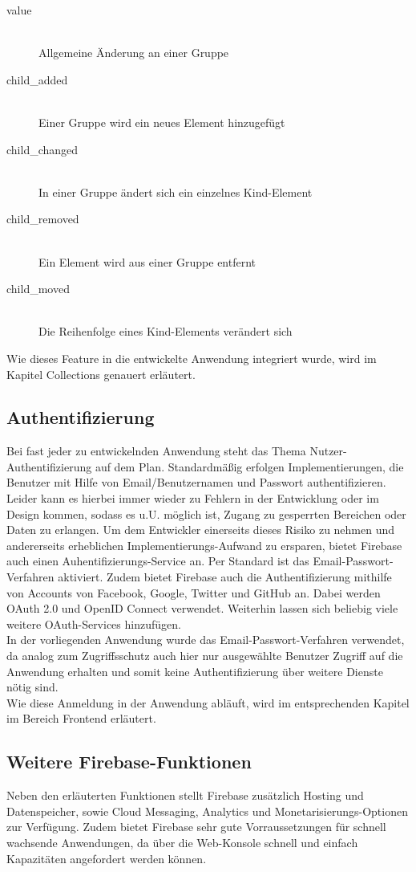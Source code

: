 \begin{description}
\item[value]\hfill \\
Allgemeine Änderung an einer Gruppe
\item[child\_added]\hfill \\ 
Einer Gruppe wird ein neues Element hinzugefügt
\item[child\_changed]\hfill \\ 
In einer Gruppe ändert sich ein einzelnes Kind-Element
\item[child\_removed]\hfill \\ 
Ein Element wird aus einer Gruppe entfernt
\item[child\_moved]\hfill \\ 
Die Reihenfolge eines Kind-Elements verändert sich
\end{description}


Wie dieses Feature in die entwickelte Anwendung integriert wurde, wird im Kapitel Collections genauert erläutert.

\subsection{Authentifizierung}
Bei fast jeder zu entwickelnden Anwendung steht das Thema Nutzer-Authentifizierung auf dem Plan. Standardmäßig erfolgen Implementierungen, die Benutzer mit Hilfe von Email/Benutzernamen und Passwort authentifizieren.
Leider kann es hierbei immer wieder zu Fehlern in der Entwicklung oder im Design kommen, sodass es u.U. möglich ist, Zugang zu gesperrten Bereichen oder Daten zu erlangen.
Um dem Entwickler einerseits dieses Risiko zu nehmen und andererseits erheblichen Implementierungs-Aufwand zu ersparen, bietet Firebase auch einen Auhentifizierungs-Service an.
Per Standard ist das Email-Passwort-Verfahren aktiviert. Zudem bietet Firebase auch die Authentifizierung mithilfe von Accounts von Facebook, Google, Twitter und GitHub an. Dabei werden OAuth 2.0 und OpenID Connect verwendet. Weiterhin lassen sich
beliebig viele weitere OAuth-Services hinzufügen.\\

In der vorliegenden Anwendung wurde das Email-Passwort-Verfahren verwendet, da analog zum Zugriffsschutz auch hier nur ausgewählte Benutzer Zugriff auf die Anwendung erhalten und somit
keine Authentifizierung über weitere Dienste nötig sind.
\\
Wie diese Anmeldung in der Anwendung abläuft, wird im entsprechenden Kapitel im Bereich Frontend erläutert.

\subsection{Weitere Firebase-Funktionen}
Neben den erläuterten Funktionen stellt Firebase zusätzlich Hosting und Datenspeicher, sowie Cloud Messaging, Analytics und Monetarisierungs-Optionen zur Verfügung.
Zudem bietet Firebase sehr gute Vorraussetzungen für schnell wachsende Anwendungen, da über die Web-Konsole schnell und einfach Kapazitäten angefordert werden können.